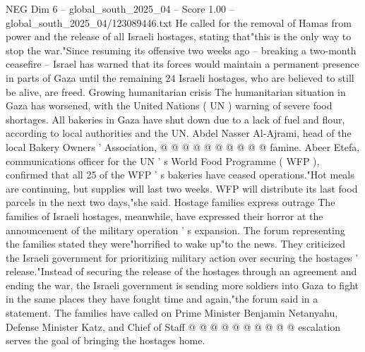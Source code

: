 \begin{textsample}{NEG Dim 6 – global\_south\_2025\_04 – Score 1.00 – global\_south\_2025\_04/123089446.txt}
He called for the removal of Hamas from power and the release of all Israeli hostages, stating that"this is the only way to stop the war."Since resuming its offensive two weeks ago -- breaking a two-month ceasefire -- Israel has warned that its forces would maintain a permanent presence in parts of Gaza until the remaining 24 Israeli hostages, who are believed to still be alive, are freed.
Growing humanitarian crisis The humanitarian situation in Gaza has worsened, with the United Nations ( UN ) warning of severe food shortages.
All bakeries in Gaza have shut down due to a lack of fuel and flour, according to local authorities and the UN.
Abdel Nasser Al-Ajrami, head of the local Bakery Owners ' Association, @ @ @ @ @ @ @ @ @ @ famine.
Abeer Etefa, communications officer for the UN ' s World Food Programme ( WFP ), confirmed that all 25 of the WFP ' s bakeries have ceased operations."Hot meals are continuing, but supplies will last two weeks.
WFP will distribute its last food parcels in the next two days,"she said.
Hostage families express outrage The families of Israeli hostages, meanwhile, have expressed their horror at the announcement of the military operation ' s expansion.
The forum representing the families stated they were"horrified to wake up"to the news.
They criticized the Israeli government for prioritizing military action over securing the hostages ' release."Instead of securing the release of the hostages through an agreement and ending the war, the Israeli government is sending more soldiers into Gaza to fight in the same places they have fought time and again,"the forum said in a statement.
The families have called on Prime Minister Benjamin Netanyahu, Defense Minister Katz, and Chief of Staff @ @ @ @ @ @ @ @ @ @ escalation serves the goal of bringing the hostages home.

\end{textsample}
